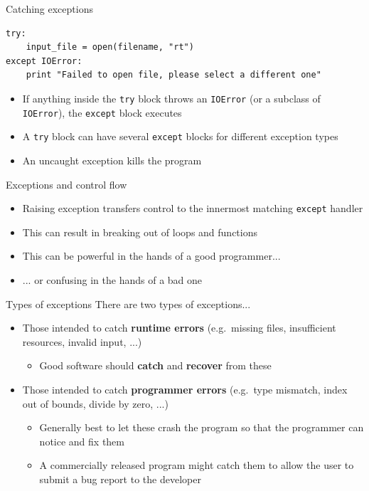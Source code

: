 \begin{frame}[fragile]{Catching exceptions}
	\begin{lstlisting}
try:
    input_file = open(filename, "rt")
except IOError:
    print "Failed to open file, please select a different one"
	\end{lstlisting}
	\begin{itemize}
		\pause\item If anything inside the \lstinline{try} block throws an
			\lstinline{IOError} (or a subclass of \lstinline{IOError}),
			the \lstinline{except} block executes
		\pause\item A \lstinline{try} block can have several \lstinline{except}
			blocks for different exception types
		\pause\item An uncaught exception kills the program
	\end{itemize}
\end{frame}

\begin{frame}{Exceptions and control flow}
	\begin{itemize}
		\pause\item Raising exception transfers control to the innermost matching
			\lstinline{except} handler
		\pause\item This can result in breaking out of loops and functions
		\pause\item This can be powerful in the hands of a good programmer...
		\pause\item ... or confusing in the hands of a bad one
	\end{itemize}
\end{frame}

\begin{frame}{Types of exceptions}
	There are two types of exceptions...
	\begin{itemize}
		\pause\item Those intended to catch \textbf{runtime errors}
			(e.g.\ missing files, insufficient resources, invalid input, ...)
			\begin{itemize}
				\pause\item Good software should \textbf{catch} and \textbf{recover} from these
			\end{itemize}
		\pause\item Those intended to catch \textbf{programmer errors}
			(e.g.\ type mismatch, index out of bounds, divide by zero, ...)
			\begin{itemize}
				\pause\item Generally best to let these crash the program so that the programmer can notice and fix them
				\pause\item A commercially released program might catch them to allow the user to submit a bug report to the developer
			\end{itemize}
	\end{itemize}
\end{frame}

